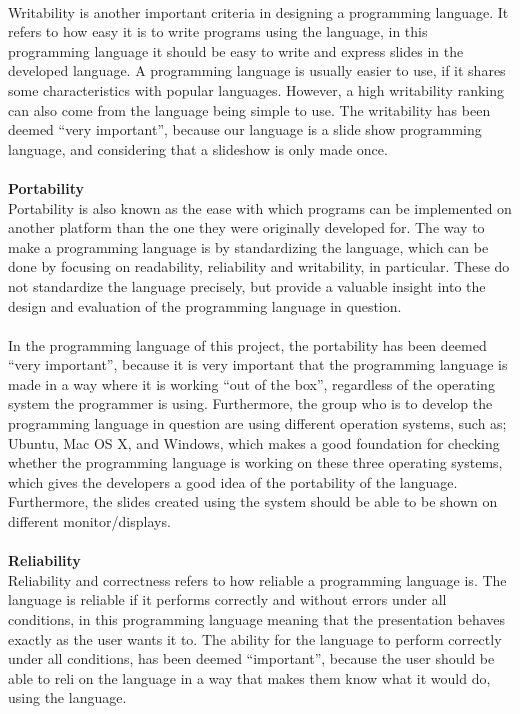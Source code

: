  \\
Writability is another important criteria in designing a programming language. It refers to how easy it is to write programs using the language, in this programming language it should be easy to write and express slides in the developed language. A programming language is usually easier to use, if it shares some characteristics with popular languages. However, a high writability ranking can also come from the language being simple to use. The writability has been deemed ``very important'', because our language is a slide show programming language, and considering that a slideshow is only made once.
\\ \\
\textbf{Portability} \\
Portability is also known as the ease with which programs can be implemented on another platform than the one they were originally developed for. The way to make a programming language is by standardizing the language, which can be done by focusing on readability, reliability and writability, in particular. These do not standardize the language precisely, but provide a valuable insight into the design and evaluation of the programming language in question.
\\ \\
In the programming language of this project, the portability has been deemed ``very important'', because it is very important that the programming language is made in a way where it is working ``out of the box'', regardless of the operating system the programmer is using. Furthermore, the group who is to develop the programming language in question are using different operation systems, such as; Ubuntu, Mac OS X, and Windows, which makes a good foundation for checking whether the programming language is working on these three operating systems, which gives the developers a good idea of the portability of the language. Furthermore, the slides created using the system should be able to be shown on different monitor/displays.
\\ \\
\textbf{Reliability} \\
Reliability and correctness refers to how reliable a programming language is. The language is reliable if it performs correctly and without errors under all conditions, in this programming language meaning that the presentation behaves exactly as the user wants it to. The ability for the language to perform correctly under all conditions, has been deemed ``important'', because the user should be able to reli on the language in a way that makes them know what it would do, using the language.
